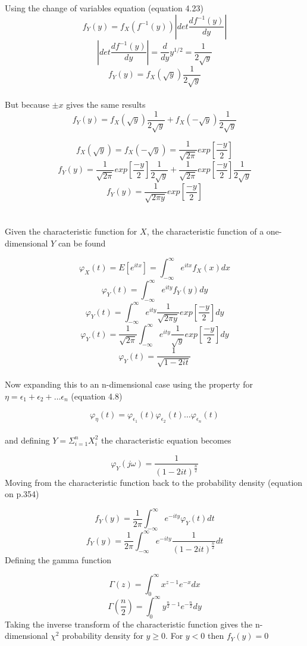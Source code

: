 \documentclass[10pt]{article}
\begin{document}
\noindent
Using the change of variables equation (equation 4.23)
\[ f_Y(y)=f_X(f^{-1}(y)) \left| det\frac{df^{-1}(y)}{dy} \right| \]
\[ \left| det\frac{df^{-1}(y)}{dy} \right| = \frac{d}{dy}y^{1/2} = \frac{1}{2 \sqrt{y}} \]
\[  f_Y(y)= f_X(\sqrt{y})\frac{1}{2 \sqrt{y}} \]
\\

\noindent
But because $\pm x$ gives the same results
\[ f_Y(y)= f_X(\sqrt{y})\frac{1}{2 \sqrt{y}} + f_X(-\sqrt{y})\frac{1}{2 \sqrt{y}}\]

\[ f_X(\sqrt{y})=f_X(-\sqrt{y}) = \frac{1}{\sqrt{2\pi}}exp\left[ \frac{-y}{2} \right] \]
\[ f_Y(y)=\frac{1}{\sqrt{2\pi}}exp\left[ \frac{-y}{2} \right]\frac{1}{2\sqrt{y}} + \frac{1}{\sqrt{2\pi}}exp\left[ \frac{-y}{2} \right] \frac{1}{2\sqrt{y}} \]
\[ f_Y(y)=\frac{1}{\sqrt{2\pi y}}exp\left[\frac{-y}{2}\right] \]
\\
\\
Given the characteristic function for $X$, the characteristic function of a one-dimensional $Y$ can be found 

\[ \varphi_X(t)=E \left[ e^{itx} \right] = \int_{-\infty}^{\infty}e^{itx}f_X(x)dx \]
\[ \varphi_Y(t)=\int_{-\infty}^{\infty}e^{i t y}f_Y(y)dy\]
\[ \varphi_Y(t)=\int_{-\infty}^{\infty}e^{i t y} \frac{1}{\sqrt{2\pi y}}exp\left[\frac{-y}{2}\right] dy \]
\[ \varphi_Y(t)= \frac{1}{\sqrt{2\pi}}  \int_{-\infty}^{\infty}e^{i t y} \frac{1}{\sqrt{y}}  exp\left[\frac{-y}{2}\right] dy\]
\[ \varphi_Y(t)= \frac{1}{\sqrt{1-2it}} \]
\\
Now expanding this to an n-dimensional case using the property for $\eta=\epsilon_1+\epsilon_2+ \dots \epsilon_n$ (equation 4.8)

\[\varphi_{\eta}(t)=\varphi_{\epsilon_1}(t)\varphi_{\epsilon_2}(t) \dots \varphi_{\epsilon_n}(t) \]
\\
and defining $Y=\Sigma_{i=1}^n X_i^2$ the characteristic equation becomes

\[ \varphi_Y(j \omega)=\frac{1}{(1-2it)^{\frac{n}{2}}} \]
Moving from the characteristic function back to the probability density (equation on p.354)

\[ f_Y(y)= \frac{1}{2\pi}\int_{-\infty}^{\infty}e^{-ity}\varphi_Y(t)dt \]
\[ f_Y(y)= \frac{1}{2\pi}\int_{-\infty}^{\infty}e^{-ity} \frac{1}{(1-2it)^{\frac{n}{2}}} dt \]
Defining the gamma function

\[ \Gamma(z)=\int_0^{\infty}x^{z-1}e^{-x}dx \]
\[ \Gamma(\frac{n}{2})= \int_0^{\infty}y^{\frac{n}{2}-1}e^{-\frac{n}{2}}dy \]
Taking the inverse transform of the characteristic function gives the n-dimensional $\chi ^2$ probability density for $y\geq 0$. For $y < 0$ then $f_Y(y)=0$
\end{document}
